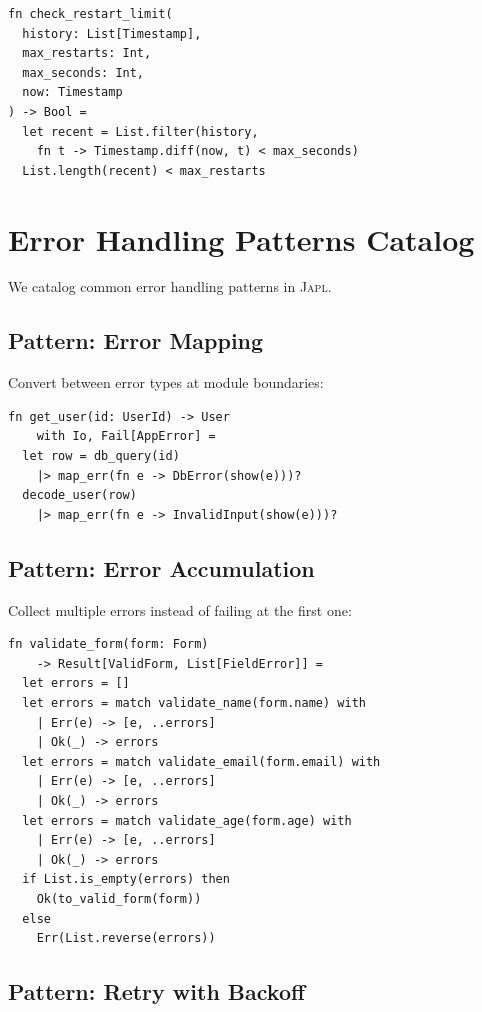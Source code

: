 \documentclass[11pt,twocolumn]{article}
\newcommand{\japl}{\textsc{Japl}}
\begin{document}
\begin{lstlisting}
fn check_restart_limit(
  history: List[Timestamp],
  max_restarts: Int,
  max_seconds: Int,
  now: Timestamp
) -> Bool =
  let recent = List.filter(history,
    fn t -> Timestamp.diff(now, t) < max_seconds)
  List.length(recent) < max_restarts
\end{lstlisting}

\section{Error Handling Patterns Catalog}\label{app:patterns}

We catalog common error handling patterns in \japl{}.

\subsection{Pattern: Error Mapping}

Convert between error types at module boundaries:

\begin{lstlisting}
fn get_user(id: UserId) -> User
    with Io, Fail[AppError] =
  let row = db_query(id)
    |> map_err(fn e -> DbError(show(e)))?
  decode_user(row)
    |> map_err(fn e -> InvalidInput(show(e)))?
\end{lstlisting}

\subsection{Pattern: Error Accumulation}

Collect multiple errors instead of failing at the first one:

\begin{lstlisting}
fn validate_form(form: Form)
    -> Result[ValidForm, List[FieldError]] =
  let errors = []
  let errors = match validate_name(form.name) with
    | Err(e) -> [e, ..errors]
    | Ok(_) -> errors
  let errors = match validate_email(form.email) with
    | Err(e) -> [e, ..errors]
    | Ok(_) -> errors
  let errors = match validate_age(form.age) with
    | Err(e) -> [e, ..errors]
    | Ok(_) -> errors
  if List.is_empty(errors) then
    Ok(to_valid_form(form))
  else
    Err(List.reverse(errors))
\end{lstlisting}

\subsection{Pattern: Retry with Backoff}
\end{document}
